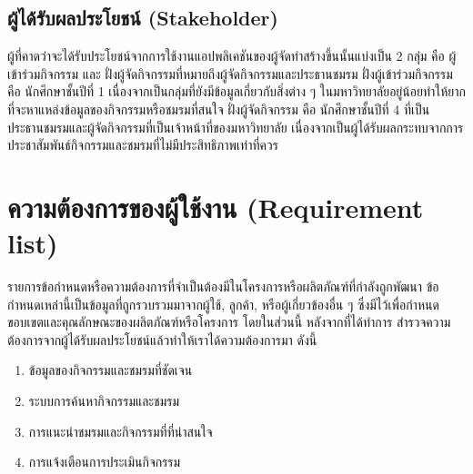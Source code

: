 \documentclass[14pt,oneside,openright,a4paper]{cpe-thai-project}
\begin{document}
\subsection{ผู้ได้รับผลประโยชน์ (Stakeholder)}
  ผู้ที่คาดว่าจะได้รับประโยชน์จากการใช้งานแอปพลิเคชันของผู้จัดทำสร้างขึ้นนั้นแบ่งเป็น 2 กลุ่ม คือ ผู้เข้าร่วมกิจกรรม และ ฝั่งผู้จัดกิจกรรมที่หมายถึงผู้จัดกิจกรรมและประธานชมรม
  ฝั่งผู้เข้าร่วมกิจกรรม คือ นักศึกษาชั้นปีที่ 1 เนื่องจากเป็นกลุ่มที่ยังมีข้อมูลเกี่ยวกับสิ่งต่าง ๆ ในมหาวิทยาลัยอยู่น้อยทำให้ยากที่จะหาแหล่งข้อมูลของกิจกรรมหรือชมรมที่สนใจ
  ฝั่งผู้จัดกิจกรรม คือ นักศึกษาชั้นปีที่ 4 ที่เป็นประธานชมรมและผู้จัดกิจกรรมที่เป็นเจ้าหน้าที่ของมหาวิทยาลัย เนื่องจากเป็นผู้ได้รับผลกระทบจากการประชาสัมพันธ์กิจกรรมและชมรมที่ไม่มีประสิทธิภาพเท่าที่ควร

\section{ความต้องการของผู้ใช้งาน (Requirement list)}
  รายการข้อกำหนดหรือความต้องการที่จำเป็นต้องมีในโครงการหรือผลิตภัณฑ์ที่กำลังถูกพัฒนา ข้อกำหนดเหล่านี้เป็นข้อมูลที่ถูกรวบรวมมาจากผู้ใช้, ลูกค้า, หรือผู้เกี่ยวข้องอื่น ๆ ซึ่งมีไว้เพื่อกำหนดขอบเขตและคุณลักษณะของผลิตภัณฑ์หรือโครงการ โดยในส่วนนี้ หลังจากที่ได้ทำการ สำรวจความต้องการจากผู้ได้รับผลประโยชน์แล้วทำให้เราได้ความต้องการมา ดังนี้ \\

\begin{enumerate}
  \item ข้อมูลของกิจกรรมและชมรมที่ชัดเจน
  \item ระบบการค้นหากิจกรรมและชมรม
  \item การแนะนำชมรมและกิจกรรมที่ที่น่าสนใจ
  \item การแจ้งเตือนการประเมินกิจกรรม
\end{enumerate}
\end{document}
